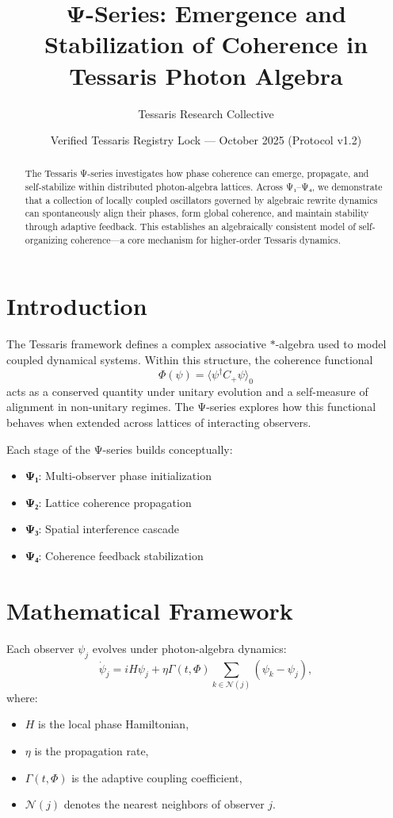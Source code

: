 \documentclass[12pt]{article}
\title{\textbf{Ψ-Series: Emergence and Stabilization of Coherence in Tessaris Photon Algebra}}
\author{Tessaris Research Collective}
\date{Verified Tessaris Registry Lock — October 2025 (Protocol v1.2)}
\begin{document}
\maketitle

\begin{abstract}
The Tessaris Ψ-series investigates how phase coherence can emerge, propagate, and self-stabilize within distributed photon-algebra lattices. Across Ψ₁–Ψ₄, we demonstrate that a collection of locally coupled oscillators governed by algebraic rewrite dynamics can spontaneously align their phases, form global coherence, and maintain stability through adaptive feedback. This establishes an algebraically consistent model of self-organizing coherence—a core mechanism for higher-order Tessaris dynamics.
\end{abstract}

\section{Introduction}
The Tessaris framework defines a complex associative $\ast$-algebra used to model coupled dynamical systems. Within this structure, the coherence functional
\[
\Phi(\psi) = \langle \psi^\dagger C_+ \psi \rangle_0
\]
acts as a conserved quantity under unitary evolution and a self-measure of alignment in non-unitary regimes.
The Ψ-series explores how this functional behaves when extended across lattices of interacting observers.

Each stage of the Ψ-series builds conceptually:
\begin{itemize}
    \item \textbf{Ψ₁}: Multi-observer phase initialization
    \item \textbf{Ψ₂}: Lattice coherence propagation
    \item \textbf{Ψ₃}: Spatial interference cascade
    \item \textbf{Ψ₄}: Coherence feedback stabilization
\end{itemize}

\section{Mathematical Framework}
Each observer $\psi_j$ evolves under photon-algebra dynamics:
\[
\dot{\psi}_j = iH \psi_j + \eta \Gamma(t, \Phi) \sum_{k \in \mathcal{N}(j)} (\psi_k - \psi_j),
\]
where:
\begin{itemize}
    \item $H$ is the local phase Hamiltonian,
    \item $\eta$ is the propagation rate,
    \item $\Gamma(t,\Phi)$ is the adaptive coupling coefficient,
    \item $\mathcal{N}(j)$ denotes the nearest neighbors of observer $j$.
\end{itemize}
\end{document}
